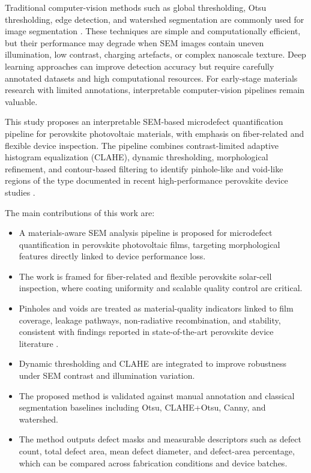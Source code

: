 \documentclass[pdflatex,sn-mathphys-num,iicol]{sn-jnl}
\theoremstyle{thmstyleone}
\theoremstyle{thmstyletwo}
\theoremstyle{thmstylethree}
\begin{document}
Traditional computer-vision methods such as global thresholding,
Otsu thresholding, edge detection, and watershed segmentation are
commonly used for image segmentation
\cite{otsu1979,canny1986,vincent1991}. These techniques are simple
and computationally efficient, but their performance may degrade when
SEM images contain uneven illumination, low contrast, charging
artefacts, or complex nanoscale texture. Deep learning approaches
can improve detection accuracy but require carefully annotated
datasets and high computational resources. For early-stage materials
research with limited annotations, interpretable computer-vision
pipelines remain valuable.

This study proposes an interpretable SEM-based microdefect
quantification pipeline for perovskite photovoltaic materials, with
emphasis on fiber-related and flexible device inspection. The pipeline
combines contrast-limited adaptive histogram equalization (CLAHE),
dynamic thresholding, morphological refinement, and contour-based
filtering to identify pinhole-like and void-like regions of the type
documented in recent high-performance perovskite device studies
\cite{chang2026,zheng2025}.

The main contributions of this work are:

\begin{itemize}
\item A materials-aware SEM analysis pipeline is proposed for
microdefect quantification in perovskite photovoltaic films,
targeting morphological features directly linked to device
performance loss.
\item The work is framed for fiber-related and flexible perovskite
solar-cell inspection, where coating uniformity and scalable quality
control are critical.
\item Pinholes and voids are treated as material-quality indicators
linked to film coverage, leakage pathways, non-radiative
recombination, and stability, consistent with findings reported in
state-of-the-art perovskite device literature \cite{chang2026,hu2023}.
\item Dynamic thresholding and CLAHE are integrated to improve
robustness under SEM contrast and illumination variation.
\item The proposed method is validated against manual annotation and
classical segmentation baselines including Otsu, CLAHE+Otsu, Canny,
and watershed.
\item The method outputs defect masks and measurable descriptors such
as defect count, total defect area, mean defect diameter, and
defect-area percentage, which can be compared across fabrication
conditions and device batches.
\end{itemize}
\end{document}
